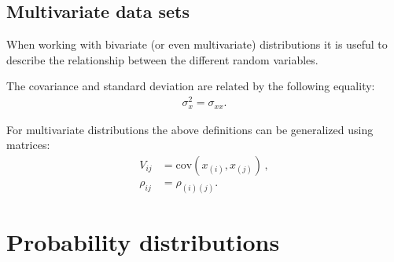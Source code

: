 \subsection{Multivariate data sets}

    When working with bivariate (or even multivariate) distributions it is useful to describe the relationship between the different random variables.

    \begin{property}
        The covariance and standard deviation are related by the following equality:
        \begin{gather}
            \sigma_x^2 = \sigma_{xx}.
        \end{gather}
    \end{property}

    \begin{remark}
        For multivariate distributions the above definitions can be generalized using matrices:
        \begin{align}
            \label{statistics:covariance_matrix}
            V_{ij} &= \mathrm{cov}(x_{(i)},x_{(j)})\,,\\
            \label{statistics:correlation_matrix}
            \rho_{ij} &= \rho_{(i)(j)}.
        \end{align}
    \end{remark}

\section{Probability distributions}

